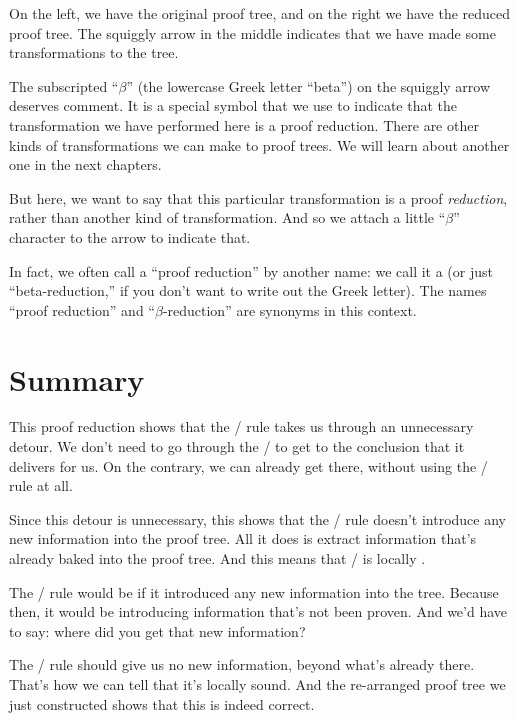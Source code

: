 \documentclass[../../../main.tex]{subfiles}
\begin{document}
\noindent
On the left, we have the original proof tree, and on the right we have the reduced proof tree. The squiggly arrow in the middle indicates that we have made some transformations to the tree. 

The subscripted ``$\beta$'' (the lowercase Greek letter ``beta'') on the squiggly arrow deserves comment. It is a special symbol that we use to indicate that the transformation we have performed here is a proof reduction. There are other kinds of transformations we can make to proof trees. We will learn about another one in the next chapters.

But here, we want to say that this particular transformation is a proof \emph{reduction}, rather than another kind of transformation. And so we attach a little ``$\beta$'' character to the arrow to indicate that.

In fact, we often call a ``proof reduction'' by another name: we call it a  (or just ``beta-reduction,'' if you don't want to write out the Greek letter). The names ``proof reduction'' and ``$\beta$-reduction'' are synonyms in this context.


\section{Summary}

This proof reduction shows that the \lolliElim/ rule takes us through an unnecessary detour. We don't need to go through the \lolliElim/ to get to the conclusion that it delivers for us. On the contrary, we can already get there, without using the \lolliElim/ rule at all.

Since this detour is unnecessary, this shows that the \lolliElim/ rule doesn't introduce any new information into the proof tree. All it does is extract information that's already baked into the proof tree.
And this means that \lolliElim/ is locally .

The \lolliElim/ rule would be  if it introduced any new information into the tree. Because then, it would be introducing information that's not been proven. And we'd have to say: where did you get that new information? 

The \lolliElim/ rule should give us no new information, beyond what's already there. That's how we can tell that it's locally sound. And the re-arranged proof tree we just constructed shows that this is indeed correct.
\end{document}
